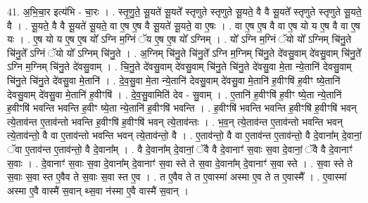 \documentclass[17pt]{extarticle}
\begin{document}
41. अ॒भि॒चा॒र इत्य॑भि - चा॒रः । . स्तृ॒णु॒ते॒ सू॒यते॑ सू॒यते᳚ स्तृणुते स्तृणुते सू॒यते॒ वै वै सू॒यते᳚ स्तृणुते स्तृणुते सू॒यते॒ वै । . सू॒यते॒ वै वै सू॒यते॑ सू॒यते॒ वा ए॒ष ए॒ष वै सू॒यते॑ सू॒यते॒ वा ए॒षः । . वा ए॒ष ए॒ष वै वा ए॒ष यो य ए॒ष वै वा ए॒ष यः । . ए॒ष यो य ए॒ष ए॒ष यो᳚ ऽग्नि म॒ग्निं ॅय ए॒ष ए॒ष यो᳚ ऽग्निम् । . यो᳚ ऽग्नि म॒ग्निं ॅयो यो᳚ ऽग्निम् चि॑नु॒ते चि॑नु॒ते᳚ ऽग्निं ॅयो यो᳚ ऽग्निम् चि॑नु॒ते । . अ॒ग्निम् चि॑नु॒ते चि॑नु॒ते᳚ ऽग्नि म॒ग्निम् चि॑नु॒ते दे॑वसु॒वाम् दे॑वसु॒वाम् चि॑नु॒ते᳚ ऽग्नि म॒ग्निम् चि॑नु॒ते दे॑वसु॒वाम् । . चि॒नु॒ते दे॑वसु॒वाम् दे॑वसु॒वाम् चि॑नु॒ते चि॑नु॒ते दे॑वसु॒वा मे॒ता न्ये॒तानि॑ देवसु॒वाम् चि॑नु॒ते चि॑नु॒ते दे॑वसु॒वा मे॒तानि॑ । . दे॒व॒सु॒वा मे॒ता न्ये॒तानि॑ देवसु॒वाम् दे॑वसु॒वा मे॒तानि॑ ह॒वीꣳषि॑ ह॒वीꣳ ष्ये॒तानि॑ देवसु॒वाम् दे॑वसु॒वा मे॒तानि॑ ह॒वीꣳषि॑ । . दे॒व॒सु॒वामिति॑ देव - सु॒वाम् । . ए॒तानि॑ ह॒वीꣳषि॑ ह॒वीꣳ ष्ये॒ता न्ये॒तानि॑ ह॒वीꣳषि॑ भवन्ति भवन्ति ह॒वीꣳ ष्ये॒ता न्ये॒तानि॑ ह॒वीꣳषि॑ भवन्ति । . ह॒वीꣳषि॑ भवन्ति भवन्ति ह॒वीꣳषि॑ ह॒वीꣳषि॑ भवन् त्ये॒ताव॑न्त ए॒ताव॑न्तो भवन्ति ह॒वीꣳषि॑ ह॒वीꣳषि॑ भवन् त्ये॒ताव॑न्तः । . भ॒व॒न् त्ये॒ताव॑न्त ए॒ताव॑न्तो भवन्ति भवन् त्ये॒ताव॑न्तो॒ वै वा ए॒ताव॑न्तो भवन्ति भवन् त्ये॒ताव॑न्तो॒ वै । . ए॒ताव॑न्तो॒ वै वा ए॒ताव॑न्त ए॒ताव॑न्तो॒ वै दे॒वाना᳚म् दे॒वानां॒ ॅवा ए॒ताव॑न्त ए॒ताव॑न्तो॒ वै दे॒वाना᳚म् । . वै दे॒वाना᳚म् दे॒वानां॒ ॅवै वै दे॒वानाꣳ॑ स॒वाः स॒वा दे॒वानां॒ ॅवै वै दे॒वानाꣳ॑ स॒वाः । . दे॒वानाꣳ॑ स॒वाः स॒वा दे॒वाना᳚म् दे॒वानाꣳ॑ स॒वा स्ते ते स॒वा दे॒वाना᳚म् दे॒वानाꣳ॑ स॒वा स्ते । . स॒वा स्ते ते स॒वाः स॒वा स्त ए॒वैव ते स॒वाः स॒वा स्त ए॒व । . त ए॒वैव ते त ए॒वास्मा॑ अस्मा ए॒व ते त ए॒वास्मै᳚ । . ए॒वास्मा॑ अस्मा ए॒वै वास्मै॑ स॒वान् थ्स॒वा न॑स्मा ए॒वै वास्मै॑ स॒वान् । \newline
\pagebreak
{}
\end{document}
